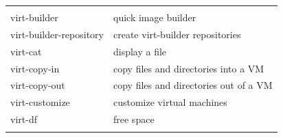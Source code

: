 \documentclass[
  14pt,
  english,
  a4paper,
]{scrreprt}
\begin{document}
\begin{longtable}[]{@{}ll@{}}
\begin{minipage}[t]{0.61\columnwidth}
\end{minipage}\tabularnewline
\begin{minipage}[t]{0.33\columnwidth}\raggedright
virt-builder\strut
\end{minipage} & \begin{minipage}[t]{0.61\columnwidth}\raggedright
quick image builder\strut
\end{minipage}\tabularnewline
\begin{minipage}[t]{0.33\columnwidth}\raggedright
virt-builder-repository\strut
\end{minipage} & \begin{minipage}[t]{0.61\columnwidth}\raggedright
create virt-builder repositories\strut
\end{minipage}\tabularnewline
\begin{minipage}[t]{0.33\columnwidth}\raggedright
virt-cat\strut
\end{minipage} & \begin{minipage}[t]{0.61\columnwidth}\raggedright
display a file\strut
\end{minipage}\tabularnewline
\begin{minipage}[t]{0.33\columnwidth}\raggedright
virt-copy-in\strut
\end{minipage} & \begin{minipage}[t]{0.61\columnwidth}\raggedright
copy files and directories into a VM\strut
\end{minipage}\tabularnewline
\begin{minipage}[t]{0.33\columnwidth}\raggedright
virt-copy-out\strut
\end{minipage} & \begin{minipage}[t]{0.61\columnwidth}\raggedright
copy files and directories out of a VM\strut
\end{minipage}\tabularnewline
\begin{minipage}[t]{0.33\columnwidth}\raggedright
virt-customize\strut
\end{minipage} & \begin{minipage}[t]{0.61\columnwidth}\raggedright
customize virtual machines\strut
\end{minipage}\tabularnewline
\begin{minipage}[t]{0.33\columnwidth}\raggedright
virt-df\strut
\end{minipage} & \begin{minipage}[t]{0.61\columnwidth}\raggedright
free space\strut
\end{minipage}\tabularnewline
\begin{minipage}[t]{0.33\columnwidth}\raggedright

\end{minipage}
\end{longtable}
\end{document}

